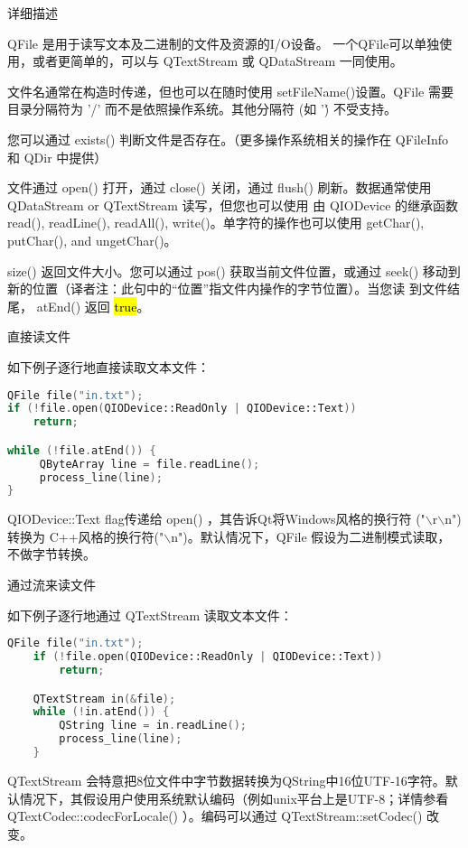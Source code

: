 \splitLine

详细描述

QFile 是用于读写文本及二进制的文件及资源的I/O设备。 一个QFile可以单独使用，或者更简单的，可以与 QTextStream 或 QDataStream 一同使用。

文件名通常在构造时传递，但也可以在随时使用 setFileName()设置。QFile 需要目录分隔符为 '/' 而不是依照操作系统。其他分隔符 (如 '\') 不受支持。

您可以通过 exists() 判断文件是否存在。（更多操作系统相关的操作在 QFileInfo 和 QDir 中提供）

文件通过 open() 打开，通过 close() 关闭，通过 flush() 刷新。数据通常使用 QDataStream or QTextStream 读写，但您也可以使用 由 QIODevice 的继承函数 read(), readLine(), readAll(), write()。单字符的操作也可以使用 getChar(), putChar(), and ungetChar()。

size() 返回文件大小。您可以通过 pos() 获取当前文件位置，或通过 seek()
移动到新的位置（译者注：此句中的“位置”指文件内操作的字节位置）。当您读
到文件结尾， atEnd() 返回 \hl{true}。

直接读文件

如下例子逐行地直接读取文本文件：

\begin{lstlisting}[language=C++]
QFile file("in.txt");
if (!file.open(QIODevice::ReadOnly | QIODevice::Text))
    return;

while (!file.atEnd()) {
     QByteArray line = file.readLine();
     process_line(line);
}
\end{lstlisting}

QIODevice::Text flag传递给 open() ，其告诉Qt将Windows风格的换行符
("$\backslash$r$\backslash$n") 转换为 C++风格的换行符("$\backslash$n")。默认情况下，QFile 假设为二进制模式读取，不做字节转换。

通过流来读文件

如下例子逐行地通过 QTextStream 读取文本文件：

\begin{lstlisting}[language=C++]
    QFile file("in.txt");
    if (!file.open(QIODevice::ReadOnly | QIODevice::Text))
        return;

    QTextStream in(&file);
    while (!in.atEnd()) {
        QString line = in.readLine();
        process_line(line);
    }
\end{lstlisting}

QTextStream 会特意把8位文件中字节数据转换为QString中16位UTF-16字符。默认情况下，其假设用户使用系统默认编码（例如unix平台上是UTF-8；详情参看 QTextCodec::codecForLocale() ）。编码可以通过 QTextStream::setCodec() 改变。

